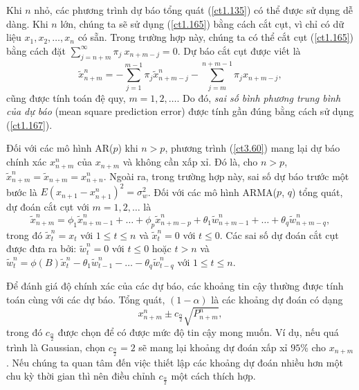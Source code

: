 \documentclass[12pt, a4paper,oneside]{book}
\theoremstyle{definition}
\begin{document}
Khi $n$ nhỏ, các phương trình dự báo tổng quát (\ref{ct1.135}) có thể được sử dụng dễ dàng. Khi $n$ lớn, chúng ta sẽ sử dụng (\ref{ct1.165}) bằng cách cắt cụt, vì chỉ có dữ liệu $x_1, x_2, \dots, x_n$ có sẵn. Trong trường hợp này, chúng ta có thể cắt cụt (\ref{ct1.165}) bằng cách đặt $\sum_{j=n+m}^{\infty} \pi_{j}\ x_{n+m-j}= 0$. Dự báo cắt cụt được viết là
\begin{equation}
\tilde{x}^{n}_{n+m}= - \sum_{j=1}^{m-1}\pi_{j}\tilde{x}_{n+m-j}^{n} - \sum_{j=m}^{n+m-1}\pi_{j}x_{n+m-j}, \label{ct1.169}
\end{equation}
cũng được tính toán đệ quy, $m = 1, 2, \dots$.  Do đó, \textit{sai số bình phương trung bình của dự báo} (mean square prediction
error) được tính gần đúng bằng cách sử dụng (\ref{ct1.167}).

Đối với các mô hình AR($p$) khi $n> p$, phương trình (\ref{ct3.60}) mang lại dự báo chính xác $x^{n}_{n+m}$ của $x_{n+m}$ và không cần xấp xỉ. Đó là, cho $n> p$, $\tilde{x}_{n+m}^{n}=\tilde{x}_{n+m}=x^{n}_{n+n}$. Ngoài ra, trong trường hợp này, sai số dự báo trước một bước là  $E(x_{n+1} - x_{n+1}^{n})^{2}=\sigma^{2}_{w}$. Đối với các mô hình ARMA($p$, $q$) tổng quát, dự đoán cắt cụt với $m = 1, 2, \dots$ là
\begin{equation}
\tilde{x}^{n}_{n+m}=\phi_{1}\tilde{x}^{n}_{n+m-1}+ \dots+ \phi_{p}\tilde{x}^{n}_{n+m-p}+ \theta_{1}\tilde{w}^{n}_{n+m-1}+ \dots+\theta_{q}\tilde{w}^{n}_{n+m-q}, \label{ct1.170}
\end{equation}
trong đó $\tilde{x}_{t}^{n}=x_{t}$ với $1\leqslant t \leqslant n$ và $\tilde{x}^{n}_{t}=0$ với $t\leqslant0$. Các sai số dự đoán cắt cụt được đưa ra bởi: $\tilde{w}_{t}^{n}=0$ với $t\leqslant0$ hoặc $t>n$ và $\tilde{w}_{t}^{n}=\phi(B)\tilde{x}_{t}^{n}-\theta_{1} \tilde{w}_{t-1}^{n}- \dots-\theta_{q}\tilde{w}_{t-q}^{n}$ với $ 1 \leq t \leq n.$ 

Để đánh giá độ chính xác của các dự báo, các khoảng tin cậy thường được tính toán cùng với các dự báo. Tổng quát, $ (1-\alpha) $ là các khoảng dự đoán có dạng 
\begin{equation}
x_{n+m}^n \pm c_{\frac{\alpha}{2}} \sqrt{P_{n+m}^n}, \label{ct1.171}
\end{equation}
trong đó $c_{\frac{\alpha}{2}} $ được chọn để có được mức độ tin cậy mong muốn. Ví dụ, nếu quá trình là Gaussian, chọn $c_{\frac{\alpha}{2}}=2$ sẽ mang lại khoảng dự đoán xấp xỉ $95\%$ cho $x_{n+m}$. Nếu chúng ta quan tâm đến việc thiết lập các khoảng dự đoán nhiều hơn một chu kỳ thời gian thì nên điều chỉnh $c_{\frac{\alpha}{2}}$ một cách thích hợp.
\end{document}
